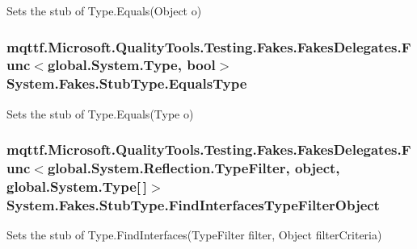 Sets the stub of Type.\-Equals(\-Object o)

\hypertarget{class_system_1_1_fakes_1_1_stub_type_a54b82e80670c47bf9aeb8eaec81f0208}{
\subsubsection[{Equals\-Type}]{\setlength{\rightskip}{0pt plus 5cm}mqttf.\-Microsoft.\-Quality\-Tools.\-Testing.\-Fakes.\-Fakes\-Delegates.\-Func$<$global.\-System.\-Type, bool$>$ System.\-Fakes.\-Stub\-Type.\-Equals\-Type}}\label{class_system_1_1_fakes_1_1_stub_type_a54b82e80670c47bf9aeb8eaec81f0208}


Sets the stub of Type.\-Equals(\-Type o)

\hypertarget{class_system_1_1_fakes_1_1_stub_type_aa2c1ab3f58d06b6c9092b6918ceac35b}{
\subsubsection[{Find\-Interfaces\-Type\-Filter\-Object}]{\setlength{\rightskip}{0pt plus 5cm}mqttf.\-Microsoft.\-Quality\-Tools.\-Testing.\-Fakes.\-Fakes\-Delegates.\-Func$<$global.\-System.\-Reflection.\-Type\-Filter, object, global.\-System.\-Type\mbox{[}$\,$\mbox{]}$>$ System.\-Fakes.\-Stub\-Type.\-Find\-Interfaces\-Type\-Filter\-Object}}\label{class_system_1_1_fakes_1_1_stub_type_aa2c1ab3f58d06b6c9092b6918ceac35b}


Sets the stub of Type.\-Find\-Interfaces(\-Type\-Filter filter, Object filter\-Criteria)

